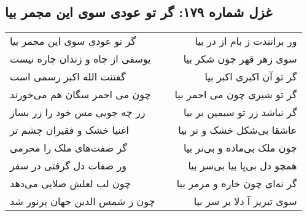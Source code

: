 \begin{center}
\section*{غزل شماره ۱۷۹: گر تو عودی سوی این مجمر بیا}
\label{sec:0179}
\begin{longtable}{l p{0.5cm} r}
گر تو عودی سوی این مجمر بیا
&&
ور برانندت ز بام از در بیا
\\
یوسفی از چاه و زندان چاره نیست
&&
سوی زهر قهر چون شکر بیا
\\
گفتنت الله اکبر رسمی است
&&
گر تو آن اکبری اکبر بیا
\\
چون می احمر سگان هم می‌خورند
&&
گر تو شیری چون می احمر بیا
\\
زر چه جویی مس خود را زر بساز
&&
گر نباشد زر تو سیمین بر بیا
\\
اغنیا خشک و فقیران چشم تر
&&
عاشقا بی‌شکل خشک و تر بیا
\\
گر صفت‌های ملک را محرمی
&&
چون ملک بی‌ماده و بی‌نر بیا
\\
ور صفات دل گرفتی در سفر
&&
همچو دل بی‌پا بیا بی‌سر بیا
\\
چون لب لعلش صلایی می‌دهد
&&
گر نه‌ای چون خاره و مرمر بیا
\\
چون ز شمس الدین جهان پرنور شد
&&
سوی تبریز آ دلا بر سر بیا
\\
\end{longtable}
\end{center}
